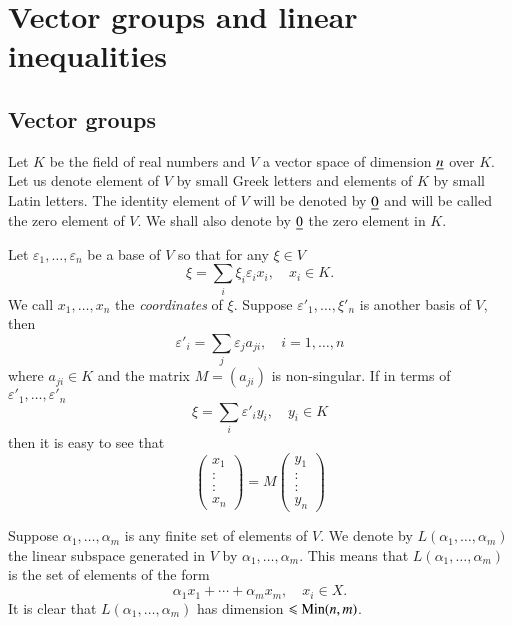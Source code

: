 \chapter{Vector groups and linear inequalities}\label{chap1}

\section{Vector groups}\label{chap1:sec1}\pageoriginale

Let $K$ be the field of real numbers and $V$ a vector space of
dimension $\underline{n}$ over $K$. Let us denote element of $V$ by small
Greek letters and elements of $K$ by small Latin letters. The identity
element of $V$ will be denoted by $\underline{0}$ and will be called the zero
element of $V$. We shall also denote by $\underline{0}$ the zero element in
$K$.  

Let $\varepsilon_{1},\ldots,\varepsilon_{n}$ be a base of $V$ so that for
any $\xi\in V$
$$
\xi = \sum_{i} \xi_{i} \varepsilon_i x_{i},\quad x_{i}\in K.
$$
We call $x_{1},\ldots,x_{n}$ the {\em coordinates} of $\xi$. Suppose
$\varepsilon'_{1},\ldots,\xi'_{n}$ is another basis of $V$, then
$$
\varepsilon'_{i}=\sum_{j}\varepsilon_{j}a_{ji},\quad i=1,\ldots,n
$$
where $a_{ji}\in K$ and the matrix $M=(a_{ji})$ is non-singular. If in
terms of $\varepsilon'_{1},\ldots,\varepsilon'_{n}$
$$
\xi=\sum_{i}\varepsilon'_{i}y_{i},\quad y_{i}\in K
$$ 
then it is easy to see that
\begin{equation*}
\begin{pmatrix}
x_{1}\\
:\\
:\\
x_{n}
\end{pmatrix}
=M
\begin{pmatrix}
y_{1}\\
:\\
:\\
y_{n}
\end{pmatrix} \tag{1}\label{c1:eq1}
\end{equation*}

Suppose $\alpha_{1},\ldots,\alpha_{m}$ is any finite set of elements
of $V$. We denote by $L(\alpha_{1},\ldots,\alpha_{m})$ the linear
subspace generated in $V$ by\pageoriginale
$\alpha_{1},\ldots,\alpha_{m}$. This means that
$L(\alpha_{1},\ldots,\alpha_{m})$ is the set of elements of the form
$$
\alpha_{1}x_{1}+\cdots+\alpha_{m}x_{m},\quad x_{i}\in X.
$$
It is clear that $L(\alpha_{1},\ldots,\alpha_{m})$ has dimension
$\leqslant \operatorname{Min} (n,m)$.

